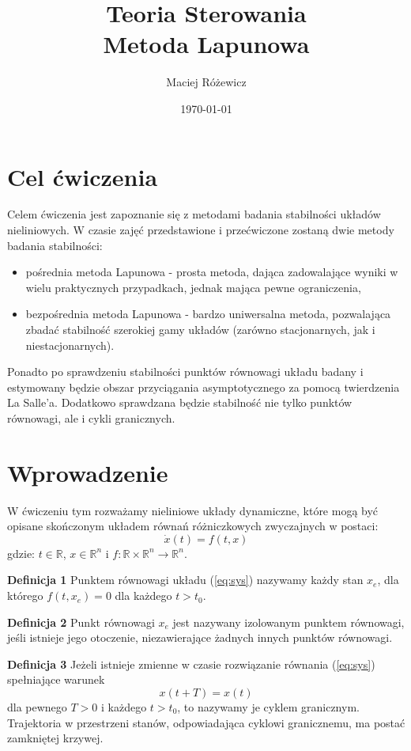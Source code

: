 \documentclass{article}
\title{
    Teoria Sterowania\\
    \Large Metoda Lapunowa
}
\author{Maciej Różewicz}
\date{\today}
\begin{document}
\maketitle

\newpage
\section{Cel ćwiczenia}
Celem ćwiczenia jest zapoznanie się z metodami badania stabilności układów nieliniowych.
W czasie zajęć przedstawione i przećwiczone zostaną dwie metody badania stabilności:
\begin{itemize}
    \item pośrednia metoda Lapunowa - prosta metoda, dająca zadowalające wyniki w wielu praktycznych przypadkach, jednak mająca pewne ograniczenia,
    \item bezpośrednia metoda Lapunowa - bardzo uniwersalna metoda, pozwalająca zbadać stabilność szerokiej gamy układów (zarówno stacjonarnych, jak i niestacjonarnych).
\end{itemize}
Ponadto po sprawdzeniu stabilności punktów równowagi układu badany i estymowany będzie 
obszar przyciągania asymptotycznego za pomocą twierdzenia La Salle'a.
Dodatkowo sprawdzana będzie stabilność nie tylko punktów równowagi, ale i cykli granicznych.

\section{Wprowadzenie}
W ćwiczeniu tym rozważamy nieliniowe układy dynamiczne, które mogą być opisane skończonym układem równań różniczkowych zwyczajnych w postaci:
\begin{equation}\label{eq:sys}
    \dot{x}(t) = f(t, x)
\end{equation}
gdzie: $t\in \mathbb{R}$, $x\in\mathbb{R}^{n}$ i $f: \mathbb{R} \times \mathbb{R}^{n} \rightarrow \mathbb{R}^{n}$.

\textbf{Definicja 1}
Punktem równowagi układu (\ref{eq:sys}) nazywamy każdy stan $x_{e}$, dla którego $f(t, x_{e}) = 0$ dla każdego $t>t_{0}$.

\textbf{Definicja 2}
Punkt równowagi $x_{e}$ jest nazywany izolowanym punktem równowagi, jeśli istnieje jego otoczenie, niezawierające żadnych innych punktów równowagi.

\textbf{Definicja 3}
Jeżeli istnieje zmienne w czasie rozwiązanie równania (\ref{eq:sys}) spełniające warunek
$$
    x(t+T) = x(t)
$$
dla pewnego $T>0$ i każdego $t>t_{0}$, to nazywamy je cyklem granicznym. Trajektoria w przestrzeni stanów, odpowiadająca cyklowi granicznemu, ma postać zamkniętej krzywej.
\end{document}
